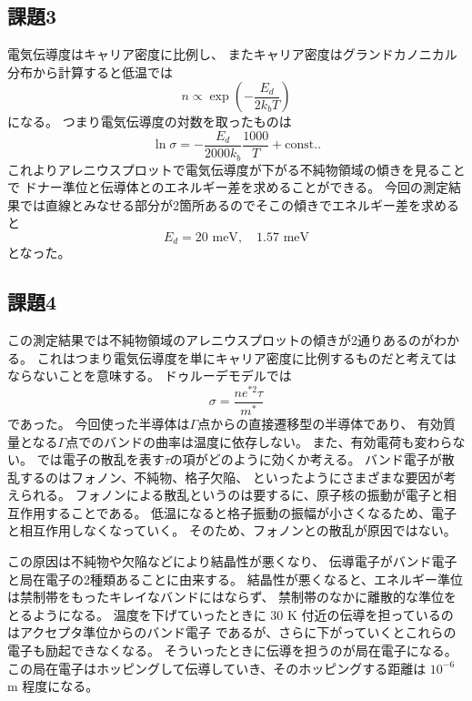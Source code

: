 \documentclass[11pt,dvipdfmx,a4paper]{jsarticle}
\begin{document}
\subsection*{課題3}
電気伝導度はキャリア密度に比例し、
またキャリア密度はグランドカノニカル分布から計算すると低温では
\begin{equation}
    n \propto \exp(-\frac{E_d}{2k_bT})
\end{equation}
になる。
つまり電気伝導度の対数を取ったものは
\begin{equation}
    \ln \sigma = -\frac{E_d}{2000k_b} \frac{1000}{T} + \text{const.}.
\end{equation}
これよりアレニウスプロットで電気伝導度が下がる不純物領域の傾きを見ることで
ドナー準位と伝導体とのエネルギー差を求めることができる。
今回の測定結果では直線とみなせる部分が2箇所あるのでそこの傾きでエネルギー差を求めると
\begin{equation}
    E_d = 20 \text{ meV},\quad 1.57 \text{ meV}
\end{equation}
となった。

\subsection*{課題4}
この測定結果では不純物領域のアレニウスプロットの傾きが2通りあるのがわかる。
これはつまり電気伝導度を単にキャリア密度に比例するものだと考えてはならないことを意味する。
ドゥルーデモデルでは
\begin{equation}
    \sigma = \frac{ne^{*2}\tau}{m^*}
\end{equation}
であった。
今回使った半導体は\(\Gamma\)点からの直接遷移型の半導体であり、
有効質量となる\(\Gamma\)点でのバンドの曲率は温度に依存しない。
また、有効電荷も変わらない。
では電子の散乱を表す\(\tau\)の項がどのように効くか考える。
バンド電子が散乱するのはフォノン、不純物、格子欠陥、
といったようにさまざまな要因が考えられる。
フォノンによる散乱というのは要するに、原子核の振動が電子と相互作用することである。
低温になると格子振動の振幅が小さくなるため、電子と相互作用しなくなっていく。
そのため、フォノンとの散乱が原因ではない。

この原因は不純物や欠陥などにより結晶性が悪くなり、
伝導電子がバンド電子と局在電子の2種類あることに由来する。
結晶性が悪くなると、エネルギー準位は禁制帯をもったキレイなバンドにはならず、
禁制帯のなかに離散的な準位をとるようになる。
温度を下げていったときに 30 K 付近の伝導を担っているのはアクセプタ準位からのバンド電子
であるが、さらに下がっていくとこれらの電子も励起できなくなる。
そういったときに伝導を担うのが局在電子になる。
この局在電子はホッピングして伝導していき、そのホッピングする距離は \(10^{-6}\) m 程度になる\cite{ibach-luth}。
\end{document}
